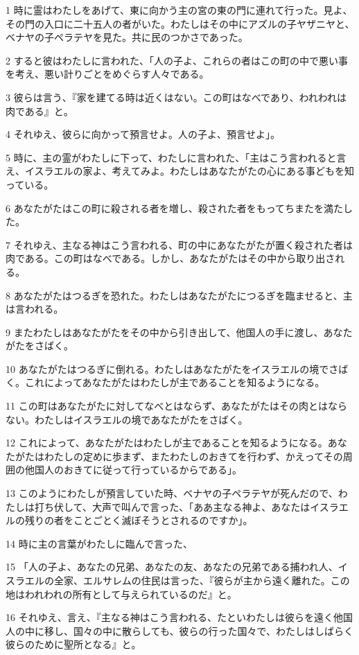 \par 1 時に霊はわたしをあげて、東に向かう主の宮の東の門に連れて行った。見よ、その門の入口に二十五人の者がいた。わたしはその中にアズルの子ヤザニヤと、ベナヤの子ペラテヤを見た。共に民のつかさであった。
\par 2 すると彼はわたしに言われた、「人の子よ、これらの者はこの町の中で悪い事を考え、悪い計りごとをめぐらす人々である。
\par 3 彼らは言う、『家を建てる時は近くはない。この町はなべであり、われわれは肉である』と。
\par 4 それゆえ、彼らに向かって預言せよ。人の子よ、預言せよ」。
\par 5 時に、主の霊がわたしに下って、わたしに言われた、「主はこう言われると言え、イスラエルの家よ、考えてみよ。わたしはあなたがたの心にある事どもを知っている。
\par 6 あなたがたはこの町に殺される者を増し、殺された者をもってちまたを満たした。
\par 7 それゆえ、主なる神はこう言われる、町の中にあなたがたが置く殺された者は肉である。この町はなべである。しかし、あなたがたはその中から取り出される。
\par 8 あなたがたはつるぎを恐れた。わたしはあなたがたにつるぎを臨ませると、主は言われる。
\par 9 またわたしはあなたがたをその中から引き出して、他国人の手に渡し、あなたがたをさばく。
\par 10 あなたがたはつるぎに倒れる。わたしはあなたがたをイスラエルの境でさばく。これによってあなたがたはわたしが主であることを知るようになる。
\par 11 この町はあなたがたに対してなべとはならず、あなたがたはその肉とはならない。わたしはイスラエルの境であなたがたをさばく。
\par 12 これによって、あなたがたはわたしが主であることを知るようになる。あなたがたはわたしの定めに歩まず、またわたしのおきてを行わず、かえってその周囲の他国人のおきてに従って行っているからである」。
\par 13 このようにわたしが預言していた時、ベナヤの子ペラテヤが死んだので、わたしは打ち伏して、大声で叫んで言った、「ああ主なる神よ、あなたはイスラエルの残りの者をことごとく滅ぼそうとされるのですか」。
\par 14 時に主の言葉がわたしに臨んで言った、
\par 15 「人の子よ、あなたの兄弟、あなたの友、あなたの兄弟である捕われ人、イスラエルの全家、エルサレムの住民は言った、『彼らが主から遠く離れた。この地はわれわれの所有として与えられているのだ』と。
\par 16 それゆえ、言え、『主なる神はこう言われる、たといわたしは彼らを遠く他国人の中に移し、国々の中に散らしても、彼らの行った国々で、わたしはしばらく彼らのために聖所となる』と。
